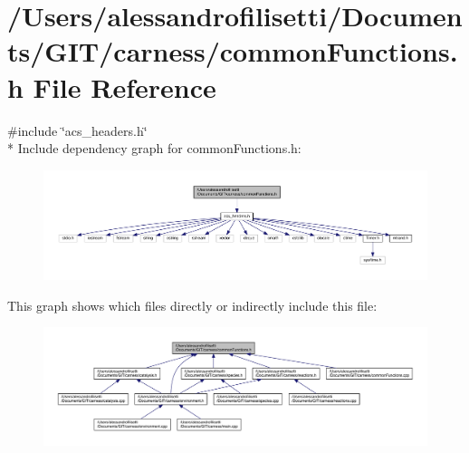 \hypertarget{a00059}{\section{/\+Users/alessandrofilisetti/\+Documents/\+G\+I\+T/carness/common\+Functions.h File Reference}
\label{a00059}
}
{\ttfamily \#include \char`\"{}acs\+\_\+headers.\+h\char`\"{}}\\*
Include dependency graph for common\+Functions.\+h\+:\nopagebreak
\begin{figure}[H]
\begin{center}
\leavevmode
\includegraphics[width=350pt]{a00176}
\end{center}
\end{figure}
This graph shows which files directly or indirectly include this file\+:\nopagebreak
\begin{figure}[H]
\begin{center}
\leavevmode
\includegraphics[width=350pt]{a00177}
\end{center}
\end{figure}
